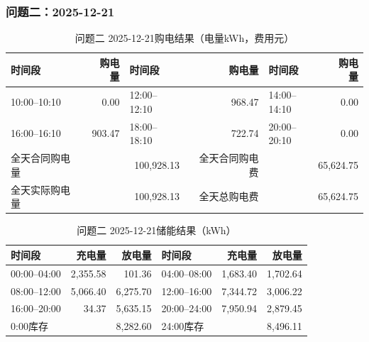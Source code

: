 \par\medskip
\par\noindent\begin{minipage}{\textwidth}
\subsubsection*{问题二：2025-12-21}
\begin{table}[H]\centering\small\setlength{\tabcolsep}{4pt}\caption{问题二 2025-12-21购电结果（电量kWh，费用元）}
\begin{tabular}{lr lr lr}\toprule
时间段 & 购电量 & 时间段 & 购电量 & 时间段 & 购电量\\\midrule
10:00--10:10 & 0.00 & 12:00--12:10 & 968.47 & 14:00--14:10 & 0.00\\
16:00--16:10 & 903.47 & 18:00--18:10 & 722.74 & 20:00--20:10 & 0.00\\
\midrule
全天合同购电量 & \multicolumn{2}{r}{100,928.13} & 全天合同购电费 & \multicolumn{2}{r}{65,624.75}\\
全天实际购电量 & \multicolumn{2}{r}{100,928.13} & 全天总购电费 & \multicolumn{2}{r}{65,624.75}\\
\bottomrule\end{tabular}\end{table}
\begin{table}[H]\centering\small\setlength{\tabcolsep}{4pt}\caption{问题二 2025-12-21储能结果（kWh）}
\begin{tabular}{lrr lrr}\toprule
时间段 & 充电量 & 放电量 & 时间段 & 充电量 & 放电量\\\midrule
00:00--04:00 & 2,355.58 & 101.36 & 04:00--08:00 & 1,683.40 & 1,702.64\\
08:00--12:00 & 5,066.40 & 6,275.70 & 12:00--16:00 & 7,344.72 & 3,006.22\\
16:00--20:00 & 34.37 & 5,635.15 & 20:00--24:00 & 7,950.94 & 2,879.45\\
\midrule
0:00库存 & \multicolumn{2}{r}{8,282.60} & 24:00库存 & \multicolumn{2}{r}{8,496.11}\\
\bottomrule\end{tabular}\end{table}
\end{minipage}\par
